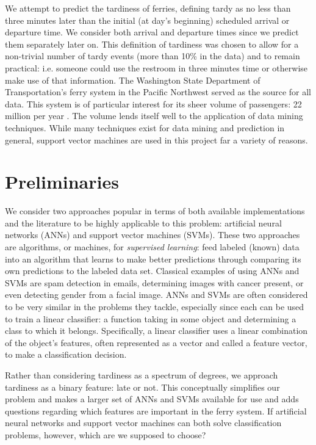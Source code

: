\documentclass[11pt]{article} %
\begin{document}
We attempt to predict the tardiness of ferries, defining tardy 
as no less than three minutes later than the initial (at day's beginning) 
scheduled arrival or departure time. We consider both arrival and departure 
times since we predict them separately later on. This definition
of tardiness was chosen to allow for a non-trivial number of tardy events 
(more than 10\% in the data) and to remain practical: i.e. someone could use the
restroom in three minutes time or otherwise make use of that information. The 
Washington State Department of Transportation's ferry system in the Pacific
Northwest served as the source for all data. This system is of 
particular interest for its sheer volume of passengers: 22 million per year 
\cite{wsfTraffic}.  The volume lends itself well to the application of 
data mining techniques. While many techniques exist for data mining and 
prediction in general, support vector machines are used in this project far a 
variety of reasons.


\section{Preliminaries}
\label{sec:prelims}
We consider two approaches popular in terms of both available implementations and 
the literature to be highly applicable to this problem:
artificial neural networks (ANNs) and support vector machines (SVMs). These two 
approaches are algorithms, or machines, for
\textit{supervised learning}: feed labeled (known) data into an
algorithm that learns to make better predictions through comparing its own 
predictions to the labeled data set. Classical examples of using ANNs and SVMs are
spam detection in emails, determining images with cancer present, or even
detecting gender from a facial image. ANNs and SVMs are often considered to be
very similar in the problems they tackle, especially since each can
be used to train a linear classifier: a function taking in some object and 
determining a class to which it belongs. Specifically, a linear classifier uses
a linear combination of the object's features, often represented as a vector and
called a feature vector, to make a classification decision.

Rather than considering tardiness as a 
spectrum of degrees, we approach tardiness as a binary feature: late or not. This 
conceptually simplifies our problem and makes a larger set of ANNs and SVMs 
available for use and adds questions regarding which features are important in 
the ferry system. 
If artificial neural networks and support vector machines 
can both solve classification problems, however, which are we supposed to choose?
\end{document}
